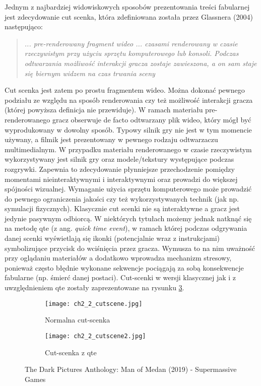 Jednym z najbardziej widowiskowych sposobów prezentowania treści fabularnej jest zdecydowanie
cut scenka, która zdefiniowana została przez Glassnera (2004) następująco:

\begin{quotation}
    \textit{... pre-renderowany fragment wideo ... czasami renderowany w czasie rzeczywistym przy
        użyciu sprzętu komputerowego lub konsoli. Podczas odtwarzania możliwość interakcji gracza
        zostaje zawieszona, a on sam staje się biernym widzem na czas trwania sceny}\cite{narrative_structures}
\end{quotation}

Cut scenka jest zatem po prostu fragmentem wideo. Można dokonać pewnego podziału ze względu na
sposób renderowania czy też możliwość interakcji gracza (której powyższa definicja nie przewiduje).
W ramach materiału pre-renderowanego gracz obserwuje de facto odtwarzany plik wideo, który mógł
być wyprodukowany w dowolny sposób. Typowy silnik gry nie jest w tym momencie używany, a filmik
jest prezentowany w pewnego rodzaju odtwarzaczu multimedialnym. W przypadku materiału renderowanego
w czasie rzeczywistym wykorzystywany jest silnik gry oraz modele/tekstury występujące podczas
rozgrywki. Zapewnia to zdecydowanie płynniejsze przechodzenie pomiędzy momentami nieinteraktywnymi
i interaktywnymi oraz prowadzi do większej spójności wizualnej. Wymaganie użycia sprzętu komputerowego
może prowadzić do pewnego ograniczenia jakości czy też wykorzystywanych technik (jak np. symulacji
fizycznych). Klasycznie cut scenki nie są interaktywne a gracz jest jedynie pasywnym odbiorcą.
W niektórych tytułach możemy jednak natknąć się na metodę \gls{qte} (z ang. \textit{quick time event}), w
ramach której podczas odgrywania danej scenki wyświetlają się ikonki (potencjalnie wraz z instrukcjami)
symbolizujące przycisk do wciśnięcia przez gracza. Wymusza to na nim uważność przy oglądaniu materiałów
a dodatkowo wprowadza mechanizm stresowy, ponieważ często błędnie wykonane sekwencje pociągają
za sobą konsekwencje fabularne (np. śmierć danej postaci). Cut-scenki w wersji klasycznej jak i z
uwzględnieniem \gls{qte} zostały zaprezentowane na rysunku \ref{fig:ch1_2_2_cutscene}.

\begin{figure}[h]
    \begin{subfigure}{0.49\textwidth}
        \texttt{[image: ch2\_2\_cutscene.jpg]}
        \caption{Normalna cut-scenka}
        \label{subfig:ch2_2_cutscene1}
    \end{subfigure}
    \begin{subfigure}{0.49\textwidth}
        \texttt{[image: ch2\_2\_cutscene2.jpg]}
        \caption{Cut-scenka z \gls{qte}}
        \label{subfig:ch2_2_cutscene2}
    \end{subfigure}
    \caption{The Dark Pictures Anthology: Man of Medan (2019) - Supermassive Games}
    \label{fig:ch1_2_2_cutscene}
\end{figure}

